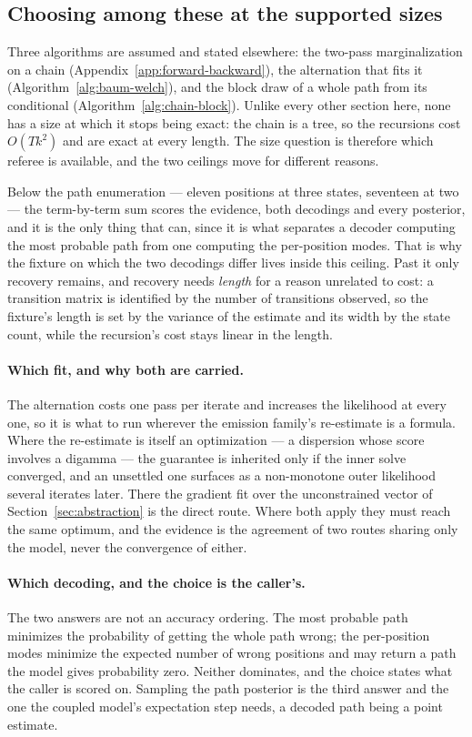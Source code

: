 \documentclass[11pt,a4paper]{article}
\begin{document}
\subsection{Choosing among these at the supported sizes}
\label{sec:hmm:discussion}
Three algorithms are assumed and stated elsewhere: the two-pass
marginalization on a chain (Appendix~\ref{app:forward-backward}), the
alternation that fits it (Algorithm~\ref{alg:baum-welch}), and the block
draw of a whole path from its conditional (Algorithm~\ref{alg:chain-block}).
Unlike every other section here, none has a size at which it stops being exact:
the chain is a tree, so the recursions cost $O(T k^2)$ and are exact at every
length. The size question is therefore which referee is available, and the two
ceilings move for different reasons.

Below the path enumeration --- eleven positions at three states, seventeen at
two --- the term-by-term sum scores the evidence, both decodings and every
posterior, and it is the only thing that can, since it is what separates a
decoder computing the most probable path from one computing the per-position
modes. That is why the fixture on which the two decodings differ lives inside
this ceiling. Past it only recovery remains, and recovery needs \emph{length}
for a reason unrelated to cost: a transition matrix is identified by the number
of transitions observed, so the fixture's length is set by the variance of the
estimate and its width by the state count, while the recursion's cost stays
linear in the length.

\paragraph{Which fit, and why both are carried.}
The alternation costs one pass per iterate and increases the likelihood at
every one, so it is what to run wherever the emission family's re-estimate is a
formula. Where the re-estimate is itself an optimization --- a dispersion whose
score involves a digamma --- the guarantee is inherited only if the inner solve
converged, and an unsettled one surfaces as a non-monotone outer likelihood
several iterates later. There the gradient fit over the unconstrained vector of
Section~\ref{sec:abstraction} is the direct route. Where both apply they must
reach the same optimum, and the evidence is the agreement of two routes sharing
only the model, never the convergence of either.

\paragraph{Which decoding, and the choice is the caller's.}
The two answers are not an accuracy ordering. The most probable path minimizes
the probability of getting the whole path wrong; the per-position modes
minimize the expected number of wrong positions and may return a path the model
gives probability zero. Neither dominates, and the choice states what the
caller is scored on. Sampling the path posterior is the third answer and the
one the coupled model's expectation step needs, a decoded path being a point
estimate.
\end{document}
